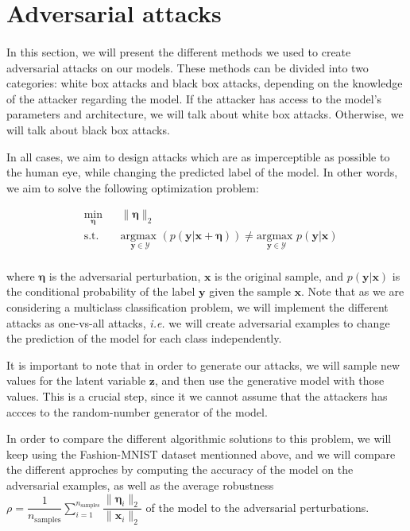 \documentclass[10pt,twocolumn,letterpaper]{article}
\begin{document}
\section{Adversarial attacks}
\label{sec:attacks}

\paragraph{} In this section, we will present the different methods we used to create adversarial attacks on our models. These methods can be divided into two categories: white box attacks and black box attacks, depending on the knowledge of the attacker regarding the model. If the attacker has access to the model's parameters and architecture, we will talk about white box attacks. Otherwise, we will talk about black box attacks. 

In all cases, we aim to design attacks which are as imperceptible as possible to the human eye, while changing the predicted label of the model. In other words, we aim to solve the following optimization problem:

\begin{equation*}
\tag{Adversarial Attack Problem}
\begin{aligned}
& \underset{\bm{\eta}}{\text{min}} 
& & \|\bm{\eta}\|_2 \\
& \text{s.t.} 
& & \underset{\bm{y} \in \mathcal{Y}}{\text{argmax }}(p(\bm{y}|\bm{x} + \bm{\eta})) \neq \underset{\bm{y} \in \mathcal{Y}}{\text{argmax }}p(\bm{y}|\bm{x}) \\
\end{aligned}
\label{pb:gen}
\end{equation*}

where $\bm{\eta}$ is the adversarial perturbation, $\bm{x}$ is the original sample, and $p(\bm{y}|\bm{x})$ is the conditional probability of the label $\bm{y}$ given the sample $\bm{x}$. Note that as we are considering a multiclass classification problem, we will implement the different attacks as one-vs-all attacks, \textit{i.e.} we will create adversarial examples to change the prediction of the model for each class independently.

It is important to note that in order to generate our attacks, we will sample new values for the latent variable $\bm{z}$, and then use the generative model with those values. This is a crucial step, since it we cannot assume that the attackers has accces to the random-number generator of the model.

In order to compare the different algorithmic solutions to this problem, we will keep using the Fashion-MNIST dataset mentionned above, and we will compare the different approches by computing the accuracy of the model on the adversarial examples, as well as the average robustness $\rho = \displaystyle \dfrac{1}{n_{\text{samples}}} \sum \limits_{i=1}^{n_{\text{samples}}} \dfrac{\|\bm{\eta}_i \|_2}{\|\bm{x}_i\|_2}$ of the model to the adversarial perturbations.
\end{document}
